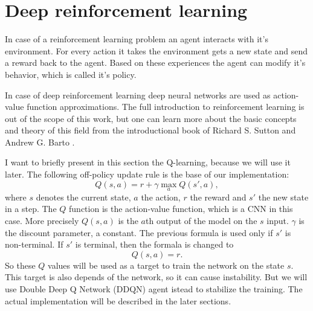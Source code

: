 \documentclass[12p]{article}
\begin{document}
  \section{Deep reinforcement learning}
    In case of a reinforcement learning problem an agent interacts with it's environment. For every action it takes
    the environment gets a new state and send a reward back to the agent. Based on these experiences the agent can modify
    it's behavior, which is called it's policy. \par
    In case of deep reinforcement learning deep neural networks are used as action-value function approximations. 
    The full introduction to reinforcement learning is out of the scope of this work, but one can learn more about the 
    basic concepts and theory of this field from the introductional book of Richard S. Sutton and Andrew G. Barto \cite{RLintro}.
    \par 
    I want to briefly present in this section the Q-learning, because we will use it later. The following off-policy
    update rule is the base of our implementation:
    \begin{equation}
        Q(s,a) = r + \gamma \max_{a} Q(s', a) ,
    \end{equation}
    where $s$ denotes the current state, $a$ the action, $r$ the reward and $s'$ the new state in a step.
    The $Q$ function is the action-value function, which is a CNN in this case. More precisely
    $Q(s,a)$ is the $a$th output of the model on the $s$ input. $\gamma$ is the discount parameter, a constant.
    The previous formula is used only if
    $s'$ is non-terminal. If $s'$ is terminal, then the formala is changed to
    \begin{equation}
        Q(s,a) = r .
    \end{equation}
    So these $Q$ values will be used as a target to train the network on the state $s$. This target
    is also depends of the network, so it can cause instability. But we will use Double Deep Q Network (DDQN)
    agent istead to stabilize the training. The actual implementation will be described in the later sections. 
\end{document}
